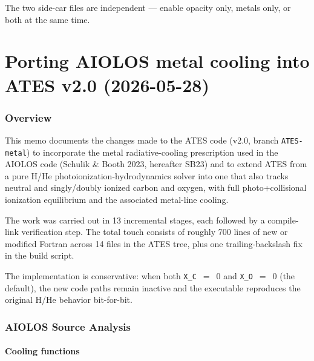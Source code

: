 \documentclass[english,a4paper]{kiseon_memo}
\begin{document}
The two side-car files are independent --- enable opacity only, metals only,
or both at the same time.


\part{Porting AIOLOS metal cooling into ATES v2.0 (2026-05-28)}

\section{Overview}

This memo documents the changes made to the ATES code (v2.0, branch
\texttt{ATES-metal}) to incorporate the metal radiative-cooling
prescription used in the AIOLOS code (Schulik \& Booth 2023, hereafter
SB23) and to extend ATES from a pure H/He photoionization-hydrodynamics
solver into one that also tracks neutral and singly/doubly ionized
carbon and oxygen, with full photo+collisional ionization equilibrium
and the associated metal-line cooling.

The work was carried out in 13 incremental stages, each followed by a
compile-link verification step.  The total touch consists of roughly
700 lines of new or modified Fortran across 14 files in the ATES tree,
plus one trailing-backslash fix in the build script.

The implementation is conservative: when both
\texttt{X\_C}~\(=\)~\(0\) and \texttt{X\_O}~\(=\)~\(0\) (the default),
the new code paths remain inactive and the executable reproduces the
original H/He behavior bit-for-bit.

\section{AIOLOS Source Analysis}

\subsection{Cooling functions}
\end{document}
